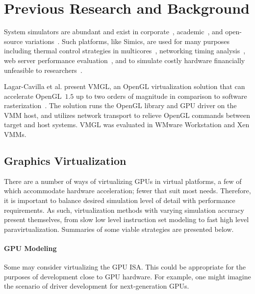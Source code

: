 
\section{Previous Research and Background}
\label{sec:previousresearch}
System simulators are abundant and exist in corporate~, academic~, and open-source variations~.
Such platforms, like Simics, are used for many purposes including thermal control strategies in multicores~, networking timing analysis~, web server performance evaluation~, and to simulate costly hardware financially unfeasible to researchers~.

Lagar-Cavilla et al. present VMGL, an OpenGL virtualization solution that can accelerate OpenGL~$1.5$ up to two orders of magnitude in comparison to software rasterization~.
The solution runs the OpenGL library and GPU driver on the VMM host, and utilizes network transport to relieve OpenGL commands between target and host systems.
VMGL was evaluated in WMware Workstation and Xen VMMs.

\subsection{Graphics Virtualization}
\label{sec:previousresearch_graphicsvirtualization}
There are a number of ways of virtualizing GPUs in virtual platforms, a few of which accommodate hardware acceleration; fewer that suit most needs.
Therefore, it is important to balance desired simulation level of detail with performance requirements.
As such, virtualization methods with varying simulation accuracy present themselves, from slow low level instruction set modeling to fast high level paravirtualization.
Summaries of some viable strategies are presented below.

\paragraph{GPU Modeling}
\label{par:previousresearch_graphicsvirtualization_gpumodeling}
Some may consider virtualizing the GPU ISA.
This could be appropriate for the purposes of development close to GPU hardware.
For example, one might imagine the scenario of driver development for next-generation GPUs.

